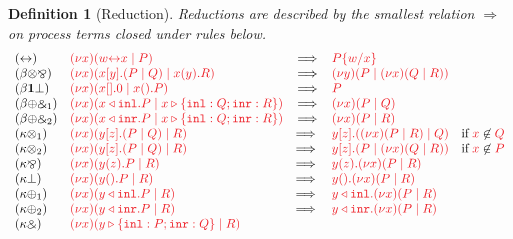 \documentclass[submission,copyright,creativecommons]{eptcs}
\newtheorem{definition}[lemma]{Definition}
\begin{document}
\begin{definition}[Reduction]\label{def:cp-reduction}
  Reductions are described by the smallest relation $\Longrightarrow$ on process terms closed under rules below.
  \begin{gather*}
      \begin{array}{llcll}
        \cpRedAxCut1
        & \tm{\cpCut{x}{\cpLink{w}{x}}{P}}
        & \Longrightarrow
        & \tm{\cpSub{w}{x}{P}}
        \\
        \cpRedBetaTensParr
        & \tm{\cpCut{x}{\cpSend{x}{y}{P}{Q}}{\cpRecv{x}{y}{R}}}
        & \Longrightarrow
        & \tm{\cpCut{y}{P}{\cpCut{x}{Q}{R}}}
        \\
        \cpRedBetaOneBot
        & \tm{\cpCut{x}{\cpHalt{x}}{\cpWait{x}{P}}}
        & \Longrightarrow
        & \tm{P}
        \\
        \cpRedBetaPlusWith1
        & \tm{\cpCut{x}{\cpInl{x}{P}}{\cpCase{x}{Q}{R}}}
        & \Longrightarrow
        & \tm{\cpCut{x}{P}{Q}}
        \\
        \cpRedBetaPlusWith2
        & \tm{\cpCut{x}{\cpInr{x}{P}}{\cpCase{x}{Q}{R}}}
        & \Longrightarrow
        & \tm{\cpCut{x}{P}{R}}
        \\
        \cpRedKappaTens1
        & \tm{\cpCut{x}{\cpSend{y}{z}{P}{Q}}{R}}
        & \Longrightarrow \;
        & \tm{\cpSend{y}{z}{\cpCut{x}{P}{R}}{Q}}
          \quad \text{if} \; \notFreeIn{x}{Q}
        \\
        \cpRedKappaTens2
        & \tm{\cpCut{x}{\cpSend{y}{z}{P}{Q}}{R}}
        & \Longrightarrow \;
        & \tm{\cpSend{y}{z}{P}{\cpCut{x}{Q}{R}}}
          \quad \text{if} \; \notFreeIn{x}{P}
        \\
        \cpRedKappaParr
        & \tm{\cpCut{x}{\cpRecv{y}{z}{P}}{R}}
        & \Longrightarrow \;
        & \tm{\cpRecv{y}{z}{\cpCut{x}{P}{R}}}
        \\
        \cpRedKappaBot
        & \tm{\cpCut{x}{\cpWait{y}{P}}{R}}
        & \Longrightarrow \;
        & \tm{\cpWait{y}{\cpCut{x}{P}{R}}}
        \\
        \cpRedKappaPlus1
        & \tm{\cpCut{x}{\cpInl{y}{P}}{R}}
        & \Longrightarrow \;
        & \tm{\cpInl{y}{\cpCut{x}{P}{R}}}
        \\
        \cpRedKappaPlus2
        &\tm{\cpCut{x}{\cpInr{y}{P}}{R}}
        & \Longrightarrow \;
        & \tm{\cpInr{y}{\cpCut{x}{P}{R}}}
        \\
        \cpRedKappaWith
        & \tm{\cpCut{x}{\cpCase{y}{P}{Q}}{R}}

\end{array}
\end{gather*}
\end{definition}
\end{document}

